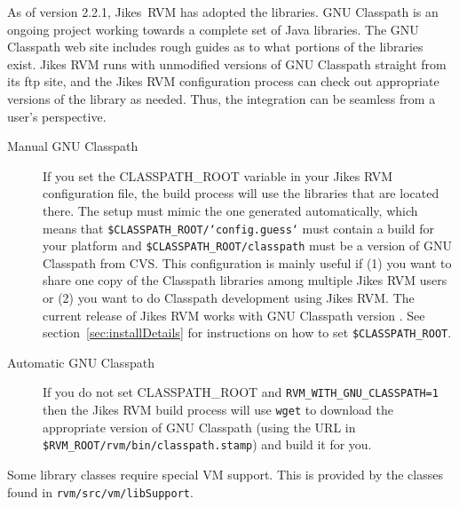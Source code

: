  As of version 2.2.1, Jikes\TMweb\ RVM has adopted the
 libraries.  GNU
Classpath is an ongoing project working towards a complete set of
Java\TMweb{} libraries.  The GNU Classpath web site includes
rough guides as to what portions of the libraries exist.  Jikes RVM
runs with unmodified versions of GNU Classpath straight from its ftp
site, and the Jikes RVM configuration process can check out
appropriate versions of the library as needed.  Thus, the integration
can be seamless from a user's perspective.

\begin{description}
\item[Manual GNU Classpath] If you set the CLASS\-PATH\_ROOT variable in
your Jikes RVM configuration file, the build process will use the
libraries that are located there.  The setup must mimic the one
generated automatically, which means that
{\tt \$CLASS\-PATH\_ROOT/\-`con\-fig.guess`} must contain a build for your platform
and {\tt \$CLASS\-PATH\_ROOT/\-class\-path} must be a version of GNU Classpath from
CVS.  This configuration is mainly useful if (1) you want to share one
copy of the Classpath libraries among multiple Jikes RVM users or (2)
you want to do Classpath development using Jikes RVM. The
current release of Jikes RVM works with GNU Classpath version
\classpathversion. See section~\ref{sec:installDetails} for instructions
on how to set {\tt \$CLASS\-PATH\_\-ROOT}.

\item[Automatic GNU Classpath] If you do not set CLASS\-PATH\_\-ROOT and 
{\tt RVM\_\-WITH\_\-GNU\_\-CLASS\-PATH=1} then the Jikes RVM build process
will use {\tt wget} to download the appropriate version of GNU Classpath (using
the URL in {\tt \$RVM\_ROOT/\-rvm/\-bin/\-class\-path.stamp}) and build it for
you. 
\end{description}

Some library classes require special VM support.  This is provided by
the classes found in {\tt rvm/\-src/\-vm/\-lib\-Sup\-port}. 

